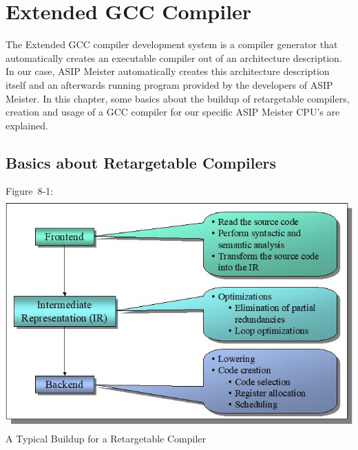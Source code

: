 \documentclass[
]{article}
\author{}
\date{}
\begin{document}
\hypertarget{extended-gcc-compiler}{%
\section{Extended GCC Compiler}\label{extended-gcc-compiler}}

The Extended GCC compiler development system is a compiler generator
that automatically creates an executable compiler out of an architecture
description. In our case, ASIP Meister automatically creates this
architecture description itself and an afterwards running program
provided by the developers of ASIP Meister. In this chapter, some basics
about the buildup of retargetable compilers, creation and usage of a GCC
compiler for our specific ASIP Meister CPU's are explained.

\hypertarget{basics-about-retargetable-compilers}{%
\subsection{Basics about Retargetable
Compilers}\label{basics-about-retargetable-compilers}}

Figure~8‑1:
\includegraphics[width=5.52292in,height=3.49444in]{8-1.png}
A Typical Buildup for a Retargetable Compiler
\end{document}
